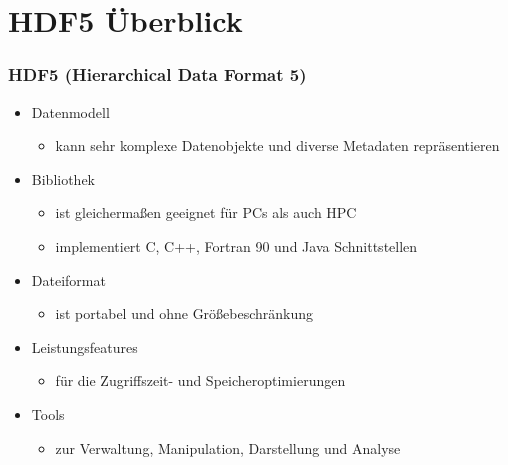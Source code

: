 \section{HDF5 Überblick}
\begin{frame}
	\frametitle{HDF5 (Hierarchical Data Format 5)}
			\begin{itemize}
				\item Datenmodell
					\begin{itemize}
						\item kann sehr komplexe Datenobjekte und diverse Metadaten repräsentieren
					\end{itemize}
				\item Bibliothek
					\begin{itemize}
						\item ist gleichermaßen geeignet für PCs als auch HPC
						\item implementiert C, C++, Fortran 90 und Java Schnittstellen
					\end{itemize}
				\item Dateiformat
					\begin{itemize}
						\item ist portabel und ohne Größebeschränkung
					\end{itemize}
				\item Leistungsfeatures
					\begin{itemize}
						\item für die Zugriffszeit- und Speicheroptimierungen
					\end{itemize}
				\item Tools
					\begin{itemize}
						\item zur Verwaltung, Manipulation, Darstellung und Analyse 
					\end{itemize}
			\end{itemize}

\end{frame}


